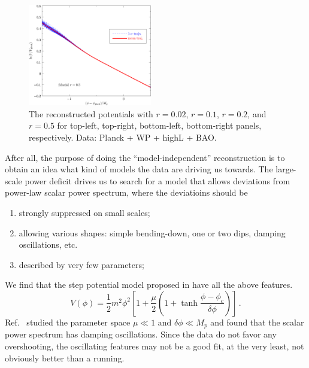 \documentclass[11pt]{article}
\def \halffigwidth{0.48\textwidth}
\begin{document}
\begin{figure}
  \includegraphics[width=\halffigwidth]{nobicep_spline0_p11_r0d5_potential_traj.pdf}
  \caption{The reconstructed potentials with $r = 0.02$, $r=0.1$, $r=0.2$, and $r=0.5$ for top-left, top-right, bottom-left, bottom-right panels, respectively.  Data: Planck + WP + highL + BAO. \label{fig:traj_potential}}
\end{figure}

After all, the purpose of doing the ``model-independent'' reconstruction is to obtain an idea what kind of models the data are driving us towards. The large-scale power deficit drives us to search for a model that allows deviations from power-law scalar power spectrum, where the deviatioins should be
\begin{enumerate}
\item{strongly suppressed on small scales;}
\item{allowing various shapes: simple bending-down, one or two dips, damping oscillations, etc.}
\item{described by very few parameters;}
\end{enumerate}

We find that the step potential model proposed in \cite{Adams2001} have all the above features.
\begin{equation}
V(\phi) = \frac{1}{2}m^2\phi^2\left[1 + \frac{\mu}{2} (1 + \tanh{\frac{\phi - \phi_c}{\delta\phi}}) \right] \,. \label{eq:pot}
\end{equation}
Ref.~\cite{Adams2001} studied the parameter space $\mu \ll 1$ and $\delta\phi \ll M_p$ and found that the scalar power spectrum has damping oscillations. Since the data do not favor any overshooting, the oscillating features may not be a good fit,  at the very least, not obviously better than a running. 
\end{document}
